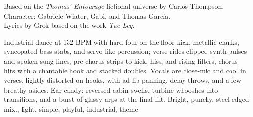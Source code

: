 

\begin{notes}
Based on the \emph{Thomas’ Entourage} fictional universe by Carlos Thompson.\\
Character: Gabriele Wiater, Gabi, and Thomas García.\\
Lyrics by Grok based on the work \emph{The Leg}.
\end{notes}

\begin{style}
Industrial dance at 132 BPM with hard four-on-the-floor kick, metallic clanks, syncopated bass stabs, and servo-like percussion; verse rides clipped synth pulses and spoken-sung lines, pre-chorus strips to kick, hiss, and rising filters, chorus hits with a chantable hook and stacked doubles. %
Vocals are close-mic and cool in verses, lightly distorted on hooks, with ad-lib panning, delay throws, and a few breathy asides. %
Ear candy: reversed cabin swells, turbine whooshes into transitions, and a burst of glassy arps at the final lift. %
Bright, punchy, steel-edged mix., light, simple, playful, industrial, theme
\end{style}

